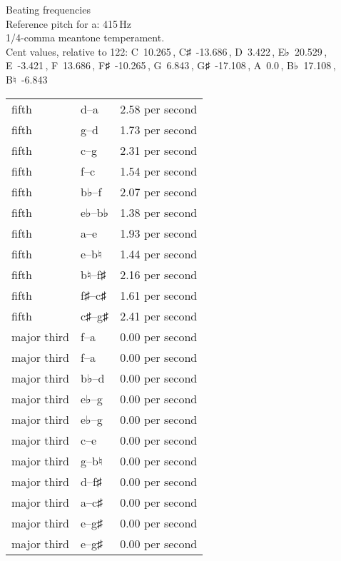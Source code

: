 \documentclass{standalone}
\def\str{\textquotesingle}
\def\cn{\textcent}
\begin{document}
\begin{minipage}{8cm}
\begin{center}
  {\Large Beating frequencies}\\[2ex]
  Reference pitch for a\str: 415\,Hz\\[1ex]
  1/4-comma meantone temperament.\\[1ex]
  Cent values, relative to 122: C~10.265\,\cn, C♯~-13.686\,\cn, D~3.422\,\cn, E♭~20.529\,\cn, E~-3.421\,\cn, F~13.686\,\cn, F♯~-10.265\,\cn, G~6.843\,\cn, G♯~-17.108\,\cn, A~0.0\,\cn, B♭~17.108\,\cn, B♮~-6.843\,\cn
\end{center}
\begin{longtable}{p{2cm}p{1cm}p{3cm}}
  \toprule
  fifth & d\str--a\str & 2.58 per second \\fifth & g--d\str & 1.73 per second \\fifth & c\str--g\str & 2.31 per second \\fifth & f--c\str & 1.54 per second \\fifth & b♭--f\str & 2.07 per second \\fifth & e♭--b♭ & 1.38 per second \\fifth & a--e\str & 1.93 per second \\fifth & e--b♮ & 1.44 per second \\fifth & b♮--f♯\str & 2.16 per second \\fifth & f♯--c♯\str & 1.61 per second \\fifth & c♯\str--g♯\str & 2.41 per second \\major third & f\str--a\str & 0.00 per second \\major third & f--a & 0.00 per second \\major third & b♭--d\str & 0.00 per second \\major third & e♭--g & 0.00 per second \\major third & e♭\str--g\str & 0.00 per second \\major third & c\str--e\str & 0.00 per second \\major third & g--b♮ & 0.00 per second \\major third & d\str--f♯\str & 0.00 per second \\major third & a--c♯\str & 0.00 per second \\major third & e\str--g♯\str & 0.00 per second \\major third & e--g♯ & 0.00 per second \\
  \bottomrule
\end{longtable}
\end{minipage}
\end{document}
